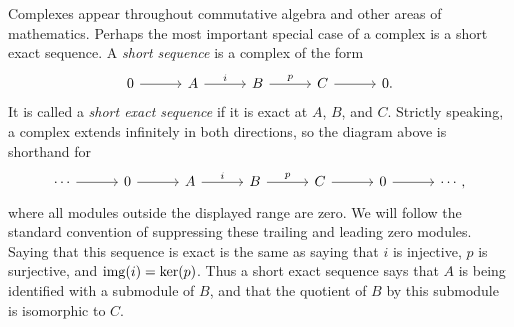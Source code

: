 \documentclass[12pt,reqno]{amsart}
\begin{document}
Complexes appear throughout commutative algebra and other areas of mathematics. Perhaps the most important special case of a complex is a short exact sequence. A \emph{short sequence} is a complex of the form
\[
\begin{tikzcd}[row sep = .3em, column sep = 3em]
0 \arrow[r] & A \arrow[r, "i"] & B \arrow[r, "p"] & C \arrow[r] & 0.
\end{tikzcd}
\]
It is called a \emph{short exact sequence} if it is exact at $A$, $B$, and $C$. Strictly speaking, a complex extends infinitely in both directions, so the diagram above is shorthand for
\[
\begin{tikzcd}[row sep = .3em, column sep = 3em]
\cdots \arrow[r] & 0 \arrow[r] & A \arrow[r, "i"] & B \arrow[r, "p"] & C \arrow[r] & 0 \arrow[r] & \cdots,
\end{tikzcd}
\]
where all modules outside the displayed range are zero. We will follow the standard convention of suppressing these trailing and leading zero modules. Saying that this sequence is exact is the same as saying that $i$ is injective, $p$ is surjective, and $\operatorname{img}(i)=\ker(p)$. Thus a short exact sequence says that $A$ is being identified with a submodule of $B$, and that the quotient of $B$ by this submodule is isomorphic to $C$.

\hrulefill
\end{document}
